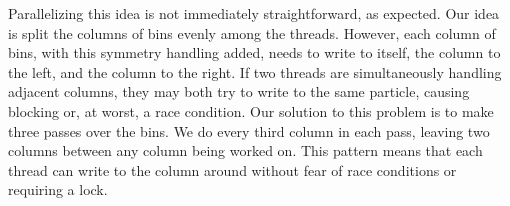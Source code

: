 \documentclass[12pt]{article}
\def\ind{\vspace{0.75em}\noindent}
\begin{document}
\ind Parallelizing this idea is not immediately straightforward,
as expected. Our idea is split the columns of bins evenly among
the threads. However, each column of bins, with this symmetry handling
added, needs to write to itself, the column to the left, and the column
to the right. If two threads are simultaneously handling adjacent
columns, they may both try to write to the same particle, causing
blocking or, at worst, a race condition. Our solution to this problem
is to make three passes over the bins. We do every third column in
each pass, leaving two columns between any column being worked on.
This pattern means that each thread can write to the column around without
fear of race conditions or requiring a lock.
\end{document}
